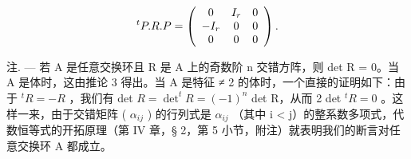 \[
{ } ^ { t } P . R . P = \left( \begin{array} { c c c } 0 & I _ { r } & 0 \\ - I _ { r } & 0 & 0 \\ 0 & 0 & 0 \end{array} \right) .
\]

注. --- 若 A 是任意交换环且 R 是 A 上的奇数阶 n 交错方阵，则 det R = 0。当 A 是体时，这由推论 3 得出。当 A 是特征 ≠ 2 的体时，一个直接的证明如下：由于 \(^tR = -R\) ，我们有 det \(R = \det ^t R = (-1)^n\) det R，从而 2 det \(^tR = 0\) 。这样一来，由于交错矩阵 ( \(\alpha_{ij}\) ) 的行列式是 \(\alpha_{ij}\) （其中 i \textless{} j）的整系数多项式，代数恒等式的开拓原理（第 IV 章，§ 2，第 5 小节，附注）就表明我们的断言对任意交换环 A 都成立。

